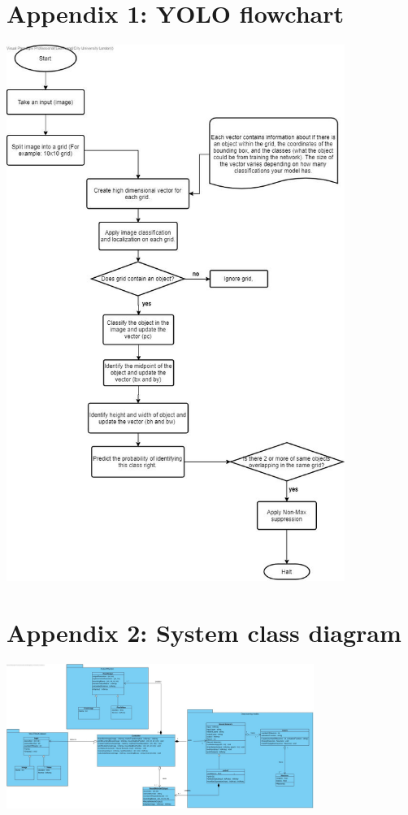 \documentclass[12pt]{report}
\begin{document}
\section*{Appendix 1: YOLO flowchart}

\includegraphics[width=110mm]{./images/YOLO.jpg}

\section*{Appendix 2: System class diagram}

\includegraphics[angle = 90,width=100mm]{./images/SD Class diagram.jpg}
\end{document}
